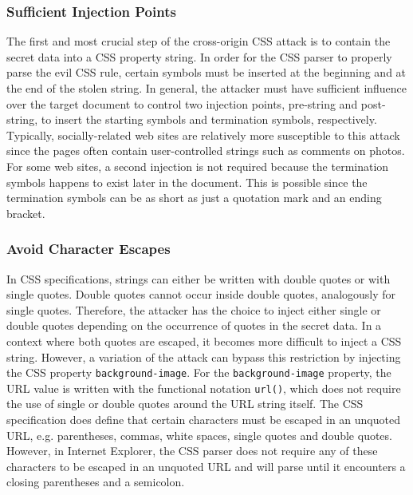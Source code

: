 \documentclass{acm_proc_article-sp}
\begin{document}
{\subsubsection{Sufficient Injection Points}
The first and most crucial step of the cross-origin CSS attack is to contain the secret data into a CSS property string. In order for the CSS parser to properly parse the evil CSS rule, certain symbols must be inserted at the beginning and at the end of the stolen string. In general, the attacker must have sufficient influence over the target document to control two injection points, pre-string and post-string, to insert the starting symbols and termination symbols, respectively. Typically, socially-related web sites are relatively more susceptible to this attack since the pages often contain user-controlled strings such as comments on photos. For some web sites, a second injection is not required because the termination symbols happens to exist later in the document. This is possible since the termination symbols can be as short as just a quotation mark and an ending bracket. 

\subsubsection{Avoid Character Escapes}
In CSS specifications\cite{css}, strings can either be written with double quotes or with single quotes. Double quotes cannot occur inside double quotes, analogously for single quotes. Therefore, the attacker has the choice to inject either single or double quotes depending on the occurrence of quotes in the secret data. In a context where both quotes are escaped, it becomes more difficult to inject a CSS string. However, a variation of the attack  can bypass this restriction by injecting the CSS property \texttt{background-image}. For the \texttt{background-image} property, the URL value is written with the functional notation \texttt{url()}, which does not require the use of single or double quotes around the URL string itself. The CSS specification does define that certain characters must be escaped in an unquoted URL, e.g. parentheses, commas, white spaces, single quotes and double quotes. However, in Internet Explorer, the CSS parser does not require any of these characters to be escaped in an unquoted URL and will parse until it encounters a closing parentheses and a semicolon.

}
\end{document}

